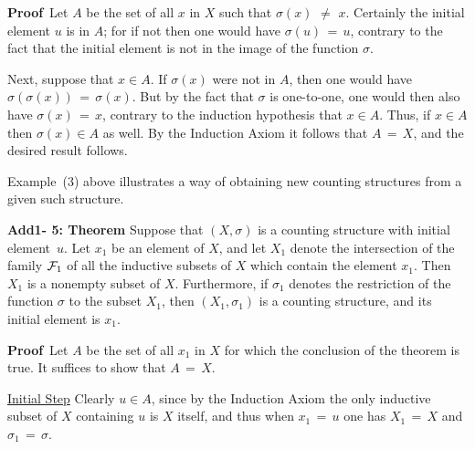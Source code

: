 \V

        {\bf Proof}\,  Let $A$ be the set of all $x$ in $X$ such that ${\sigma}(x) \,\,{\neq}\,\, x$.
    Certainly the initial element $u$ is in $A$; for if not then one would have ${\sigma}(u) \,=\, u$, contrary to the fact that the initial element is not in the image of the function ${\sigma}$.

        Next, suppose that $x{\in}A$. If ${\sigma}(x)$ were not in $A$, then one would have ${\sigma}({\sigma}(x)) \,=\, {\sigma}(x)$.
    But by the fact that ${\sigma}$ is one-to-one, one would then also have ${\sigma}(x) \,=\, x$, contrary to the induction hypothesis that $x{\in}A$.
    Thus, if $x{\in}A$ then ${\sigma}(x){\in}A$ as well.
    By the Induction Axiom it follows that $A \,=\, X$, and the desired result follows.

\V
\V


        Example~(3) above illustrates a way of obtaining new counting structures from a given such structure.

\V

        {\bf Add1- 5: Theorem} Suppose that $(X,{\sigma})$ is a counting structure with initial element~$u$.
    Let $x_{1}$ be an element of $X$, and let $X_{1}$ denote the intersection of the family ${\cal F}_{1}$ of all the inductive subsets of $X$ which contain the element $x_{1}$.
    Then $X_{1}$ is a nonempty subset of $X$.
    Furthermore, if ${\sigma}_{1}$ denotes the restriction of the function ${\sigma}$ to the subset $X_{1}$,
    then $(X_{1},{\sigma}_{1})$ is a counting structure, and its initial element is $x_{1}$.

\V

        {\bf Proof}\,  Let $A$ be the set of all $x_{1}$ in $X$ for which the conclusion of the theorem is true.
    It suffices to show that $A \,=\, X$.

        \underline{Initial Step} Clearly $u{\in}A$, since by the Induction Axiom the only inductive subset of $X$ containing $u$ is $X$ itself, and thus when $x_{1} \,=\, u$ one has $X_{1} \,=\, X$ and ${\sigma}_{1} \,=\, {\sigma}$.

